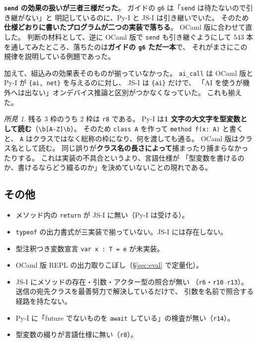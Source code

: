\documentclass[11pt,a4paper]{ltjsarticle}
\theoremstyle{definition}
\theoremstyle{remark}
\newtheorem{finding}[theorem]{所見}
\begin{document}
\item \textbf{\texttt{send} の効果の扱いが三者三様だった}。
      ガイドの \texttt{g6} は「\texttt{send} は待たないので引き継がない」と
      明記しているのに、Py-I と JS-I は引き継いでいた。
      そのため\textbf{仕様どおりに書いたプログラムが二つの実装で落ちる}。
      OCaml 版に合わせて直した。
      判断の材料として、逆に OCaml 版で \texttt{send} も引き継ぐようにして
      543 本を通してみたところ、落ちたのは\textbf{ガイドの \texttt{g6} ただ一本}で、
      それがまさにこの規律を説明している例題であった。

加えて、組込みの効果表そのものが揃っていなかった。
\texttt{ai\_call} は OCaml 版と Py-I が \texttt{\{ai, net\}} を与えるのに対し、
JS-I は \texttt{\{ai\}} だけで、
「AI を使うが機外へは出ない」オンデバイス推論と区別がつかなくなっていた。
これも揃えた。

\begin{finding}
残る 3 枠のうち 2 枠は \texttt{r8} である。
Py-I は\textbf{1 文字の大文字を型変数として読む}（\texttt{\textbackslash b[A-Z]\textbackslash b}）。
そのため \texttt{class A} を作って \texttt{method f(x: A)} と書くと、
\texttt{A} はクラスではなく総称の枠になり、何を渡しても通る。
OCaml 版はクラス名として読む。
同じ誤りが\textbf{クラス名の長さによって}捕まったり捕まらなかったりする。
これは実装の不具合というより、言語仕様が
「型変数を書けるのか、書けるならどう綴るのか」を決めていないことの現れである。
\end{finding}

\subsection{その他}

\begin{itemize}
\item メソッド内の \texttt{return} が JS-I に無い（Py-I は受ける）。
\item \texttt{typeof} の出力書式が三実装で揃っていない。JS-I には存在しない。
\item 型注釈つき変数宣言 \texttt{var x : T = e} が未実装。
\item OCaml 版 REPL の出力取りこぼし（\S\ref{sec:eval} で定量化）。
\item JS-I にメソッドの存在・引数・アクター型の照合が無い
      （\texttt{r6}・\texttt{r10}--\texttt{r13}）。
      送信の宛先クラスを最善努力で解決しているだけで、
      引数を名前で照合する経路を持たない。
\item Py-I に「future でないものを \texttt{await} している」の検査が無い（\texttt{r14}）。
\item 型変数の綴りが言語仕様に無い（\texttt{r8}）。
\end{itemize}
\end{document}
